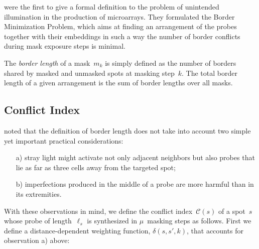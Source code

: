 \documentclass{bioinfo}
\begin{document}
\citealp{HANNENHALLI02} were the first to give a formal definition to the problem of unintended illumination in the production of microarrays. They formulated the Border Minimization Problem, which aims at finding an arrangement of the probes together with their embeddings in such a way the number of border conflicts during mask exposure steps is minimal.

The \emph{border length} of a mask~$m_{k}$ is simply defined as the number of borders shared by masked and unmasked spots at masking step~$k$. The total border length of a given arrangement is the sum of border lengths over all masks.

\subsection{Conflict Index}

\citealp{KAHNG03_1} noted that the definition of border length does not take into account two simple yet important practical considerations:
\begin{itemize}
\item[a)] stray light might activate not only adjacent neighbors but also probes that lie as far as three cells away from the targeted spot;
\item[b)] imperfections produced in the middle of a probe are more harmful than in its extremities.
\end{itemize}

With these observations in mind, we define the conflict index~$\mathcal{C}(s)$ of a spot~$s$ whose probe of length~$\ell_{s}$ is synthesized in $\mu$~masking steps as follows. First we define a distance-dependent weighting function, $\delta(s,s',k)$, that accounts for observation a) above:
\end{document}
